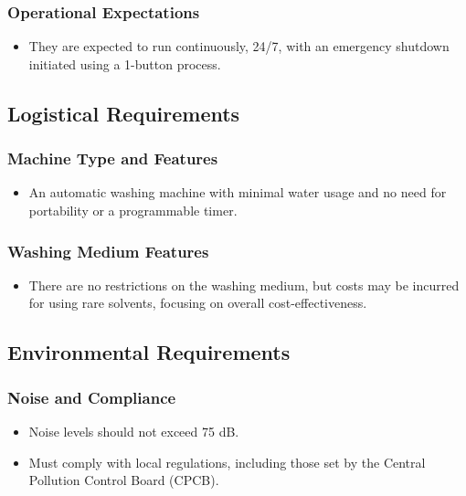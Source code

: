 \documentclass[table,french,english]{rapportCS}
\begin{document}
  \subsubsection{Operational Expectations}\label{sec: opexp}
    \begin{itemize}[label=$\bullet$]
      \item They are expected to run continuously, 24/7, with an emergency shutdown initiated using a 1-button process.
    \end{itemize}

\subsection{Logistical Requirements}\label{sec:logireq}
\subsubsection{Machine Type and Features}\label{sec:machtype}
    \begin{itemize}[label=$\bullet$]
      \item An automatic washing machine with minimal water usage and no need for portability or a programmable timer.
    \end{itemize}
\subsubsection{Washing Medium Features}\label{sec:wmtype}
    \begin{itemize}[label=$\bullet$]
      \item There are no restrictions on the washing medium, but costs may be incurred for using rare solvents, focusing on overall cost-effectiveness.
    \end{itemize}

\subsection{ Environmental Requirements}\label{subsec:envireq}
\subsubsection{Noise and Compliance}\label{sec:noisecomp}
    \begin{itemize}[label=$\bullet$]
      \item Noise levels should not exceed 75 dB.
      \item Must comply with local regulations, including those set by the Central Pollution Control Board (CPCB).
    \end{itemize}
  
\end{document}
